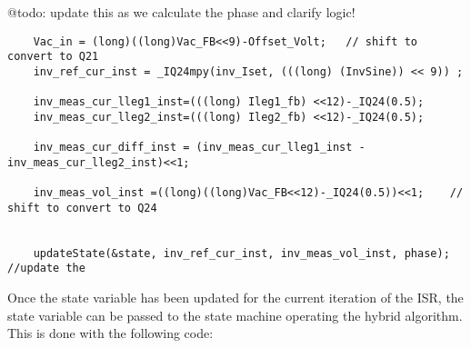 @todo: update this as we calculate the phase and clarify logic!
\begin{lstlisting}
	Vac_in = (long)((long)Vac_FB<<9)-Offset_Volt;	// shift to convert to Q21
	inv_ref_cur_inst = _IQ24mpy(inv_Iset, (((long) (InvSine)) << 9)) ;

	inv_meas_cur_lleg1_inst=(((long) Ileg1_fb) <<12)-_IQ24(0.5);
	inv_meas_cur_lleg2_inst=(((long) Ileg2_fb) <<12)-_IQ24(0.5);

	inv_meas_cur_diff_inst = (inv_meas_cur_lleg1_inst - inv_meas_cur_lleg2_inst)<<1;

	inv_meas_vol_inst =((long)((long)Vac_FB<<12)-_IQ24(0.5))<<1;	// shift to convert to Q24


	updateState(&state, inv_ref_cur_inst, inv_meas_vol_inst, phase);		//update the
\end{lstlisting}
 
Once the state variable has been updated for the current iteration of the ISR, the state variable can be passed to the state machine operating the hybrid algorithm. This is done with the following code:

